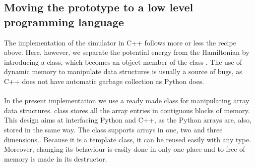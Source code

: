 \subsection{Moving the prototype to a low level programming language}\label{cppPrototype}
The implementation of the simulator in C++ follows more or less the recipe above. Here, however, we separate the potential energy from the Hamiltonian by introducing a  class, which becomes an object member of the class . The use of dynamic memory to manipulate data structures is usually a source of bugs, as C++ does not have automatic garbage collection as Python does. \\
\\
In the present implementation we use a ready made class for manipulating array data structures. { class stores all the array entries in contiguous blocks of me\-mo\-ry\cite{Langtangen2000}. This design aims at interfacing Python and C++, as the Python arrays are, also, stored in the same way. The class  supports arrays in one, two and three dimensions.}\cite{HPL}. Because it is a template class, it can be reused easily with any type. Moreover, changing its behaviour is easily done in only one place and to free of me\-mo\-ry is made in its destructor\cite{Langtangen2000}.\\


